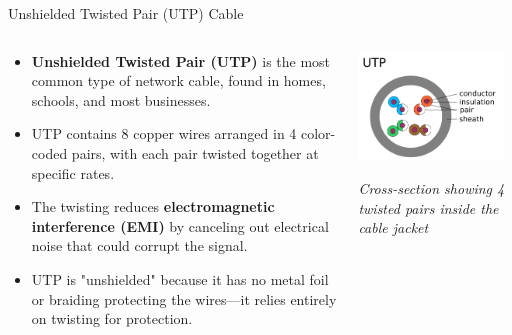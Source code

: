 \documentclass[aspectratio=169]{beamer}
\begin{document}
\begin{frame}{Unshielded Twisted Pair (UTP) Cable}
    \begin{columns}[T]
        \begin{column}{0.55\textwidth}
            \begin{itemize}
                \item \textbf{Unshielded Twisted Pair (UTP)} is the most common type of network cable, found in homes, schools, and most businesses.
                \item UTP contains 8 copper wires arranged in 4 color-coded pairs, with each pair twisted together at specific rates.
                \item The twisting reduces \textbf{electromagnetic interference (EMI)} by canceling out electrical noise that could corrupt the signal.
                \item UTP is "unshielded" because it has no metal foil or braiding protecting the wires---it relies entirely on twisting for protection.
            \end{itemize}
        \end{column}
        \begin{column}{0.4\textwidth}
            \centering
            \includegraphics[width=0.95\textwidth]{UTP-cable-cross-section.png}
            \vspace{0.2cm}
            
            \small{\textit{Cross-section showing 4 twisted pairs inside the cable jacket}}
        \end{column}
    \end{columns}
\end{frame}
\end{document}
